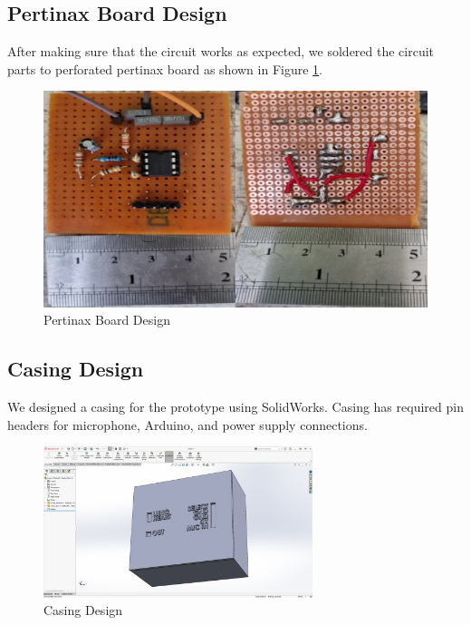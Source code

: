 \newpage
\thispagestyle{plain}

\subsection{Pertinax Board Design}

After making sure that the circuit works as expected, we soldered the circuit parts to perforated pertinax board as shown in Figure \ref{fig:pertinax_board_design}.

\begin{figure}[h]
    \centering
    \includegraphics[width=1\textwidth]{assets/pertinax-design.png}
    \caption{Pertinax Board Design}
    \label{fig:pertinax_board_design}
\end{figure}

\newpage
\thispagestyle{plain}

\subsection{Casing Design}

We designed a casing for the prototype using SolidWorks. Casing has required pin headers for microphone, Arduino, and power supply connections.

\begin{figure}[h]
    \centering
    \includegraphics[width=0.7\textwidth]{assets/3d-design.png}
    \caption{Casing Design}
    \label{fig:casing_design}
\end{figure}

